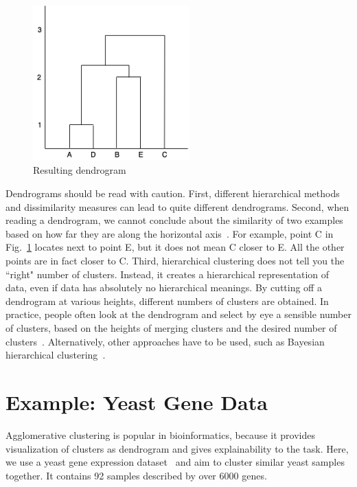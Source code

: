 \begin{figure}[htp]
\centering
\captionsetup{justification=centering}
\includegraphics[width=6cm]{"Part 3 - Learning Systems/Unsupervised Learning/Hierarchical Clustering/figures/Dendrogram.png"}
\caption{Resulting dendrogram}
\label{fig:dendro}
\end{figure}

Dendrograms should be read with caution. First, different hierarchical methods and dissimilarity measures can lead to quite different dendrograms. Second, when reading a dendrogram, we cannot conclude about the similarity of two examples based on how far they are along the horizontal axis~\cite{James2013}. For example, point C in Fig.~\ref{fig:dendro} locates next to point E, but it does not mean C closer to E. All the other points are in fact closer to C. Third, hierarchical clustering does not tell you the ``right" number of clusters. Instead, it creates a hierarchical representation of data, even if data has absolutely no hierarchical meanings. By cutting off a dendrogram at various heights, different numbers of clusters are obtained. In practice, people often look at the dendrogram and select by eye a sensible number of clusters, based on the heights of merging clusters and the desired number of clusters~\cite{James2013}. Alternatively, other approaches have to be used, such as Bayesian hierarchical clustering~\cite{Heller2005}.

\section{Example: Yeast Gene Data}

Agglomerative clustering is popular in bioinformatics, because it provides visualization of clusters as dendrogram and gives explainability to the task. Here, we use a yeast gene expression dataset~\cite{Kaggle2016} and aim to cluster similar yeast samples together. It contains 92 samples described by over 6000 genes. 

